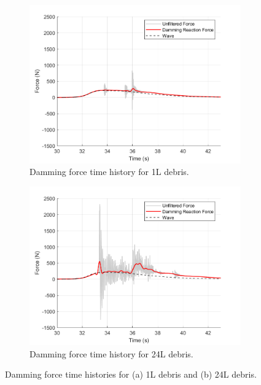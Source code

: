 \documentclass{article}
\begin{document}
\begin{figure}[h!]
    \centering
    \begin{subfigure}[b]{0.48\textwidth}
        \centering
        \includegraphics[width=\textwidth]{Reg_Lift_U_1_L_D__Masters_NHERIDeprisImpact2_goodtests_Reg_Lift_U_1_L_Trial04_Damming.png}
        \caption{Damming force time history for 1L debris.}
        \label{fig:timehist_1L_damming}
    \end{subfigure}
    \hfill
    \begin{subfigure}[b]{0.48\textwidth}
        \centering
        \includegraphics[width=\textwidth]{Reg_Lift_U_24_L_D__Masters_NHERIDeprisImpact2_goodtests_Reg_Lift_U_24_L_Trial04_Damming.png}
        \caption{Damming force time history for 24L debris.}
        \label{fig:timehist_24L_damming}
    \end{subfigure}
    \caption{Damming force time histories for (a) 1L debris and (b) 24L debris.}
    \label{fig:timehist_damming_combined}
\end{figure}
\end{document}
